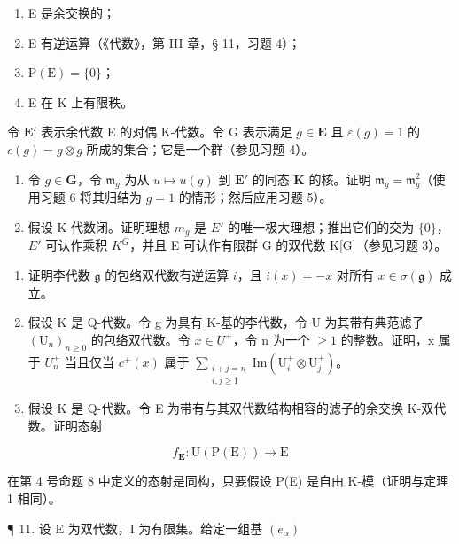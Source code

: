 \begin{enumerate}
\def\labelenumi{(\roman{enumi})}
\item
  E 是余交换的；
\item
  E 有逆运算（《代数》，第 III 章，§ 11，习题 4）；
\item
  \(\mathrm{P(E)} = \{0\}\)；
\item
  E 在 K 上有限秩。
\end{enumerate}

令 \(\mathbf{E}'\) 表示余代数 E 的对偶 K-代数。令 G 表示满足 \(g \in \mathbf{E}\) 且 \(\varepsilon(g) = 1\) 的 \(c(g) = g \otimes g\) 所成的集合；它是一个群（参见习题 4）。

\begin{enumerate}
\def\labelenumi{(\alph{enumi})}
\item
  令 \(g \in \mathbf{G}\)，令 \(\mathfrak{m}_g\) 为从 \(u \mapsto u(g)\) 到 \(\mathbf{E}'\) 的同态 \(\mathbf{K}\) 的核。证明 \(\mathfrak{m}_g = \mathfrak{m}_g^2\)（使用习题 6 将其归结为 \(g = 1\) 的情形；然后应用习题 5）。
\item
  假设 K 代数闭。证明理想 \(m_{g}\) 是 \(E'\) 的唯一极大理想；推出它们的交为 \(\{0\}\)，\(E'\) 可认作乘积 \(K^{G}\)，并且 E 可认作有限群 G 的双代数 K[G]（参见习题 3）。
\end{enumerate}

\begin{enumerate}
\def\labelenumi{\arabic{enumi}.}
\setcounter{enumi}{7}
\item
  证明李代数 \(\mathfrak{g}\) 的包络双代数有逆运算 \(i\)，且 \(i(x) = -x\) 对所有 \(x \in \sigma(\mathfrak{g})\) 成立。
\item
  假设 K 是 Q-代数。令 g 为具有 K-基的李代数，令 U 为其带有典范滤子 \((\mathrm{U}_{n})_{n\geqslant0}\) 的包络双代数。令 \(x\in U^{+}\)，令 n 为一个 \(\geqslant1\) 的整数。证明，x 属于 \(U_{n}^{+}\) 当且仅当 \(c^{+}(x)\) 属于 \(\sum_{\substack{i+j=n\\ i,j\geqslant1}}\mathrm{Im}(\mathrm{U}_{i}^{+}\otimes\mathrm{U}_{j}^{+})\)。
\item
  假设 K 是 Q-代数。令 E 为带有与其双代数结构相容的滤子的余交换 K-双代数。证明态射
\end{enumerate}

\[
f _ {\mathbf {E}} \colon \mathrm{U} (\mathrm{P} (\mathrm{E})) \rightarrow \mathrm{E}
\]

在第 4 号命题 8 中定义的态射是同构，只要假设 P(E) 是自由 K-模（证明与定理 1 相同）。

¶ 11. 设 E 为双代数，I 为有限集。给定一组基 \((e_{\alpha})\)


